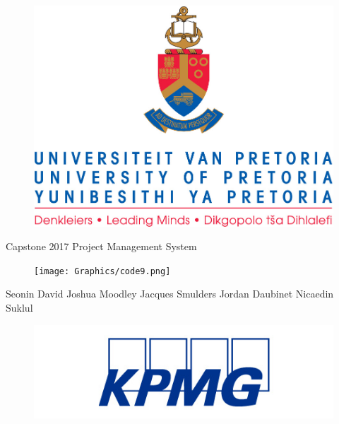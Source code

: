 \documentclass[a4paper,12pt]{article}
\begin{document}
\selectfont
	\begin{center}\thispagestyle{empty}
		\begin{figure}[h]
			\centering
			\includegraphics[width=0.60\linewidth]{Graphics/uplogo.jpg}
		\end{figure}
		
		\newline
		{\Huge{}\selectfont 
			Capstone 2017 \linebreak
			Project Management System  
		}
		
		\begin{figure}[h]
			\centering
			\texttt{[image: Graphics/code9.png]}
		\end{figure} 
		
		\begin{LARGE}
			Seonin David
			\linebreak
			\linebreak
			Joshua Moodley
			\linebreak
			\linebreak
			Jacques Smulders
			\linebreak
			\linebreak
			Jordan Daubinet
			\linebreak
			\linebreak
			Nicaedin Suklul
		\end{LARGE}
	\end{center}
	
	\begin{figure}[b]
		\centering
		\includegraphics[width=0.4\linewidth]{Graphics/kpmgLogo.jpg}
	\end{figure}  
	
	\newpage
	\tableofcontents
	\clearpage
	\newpage
	
\end{document}
